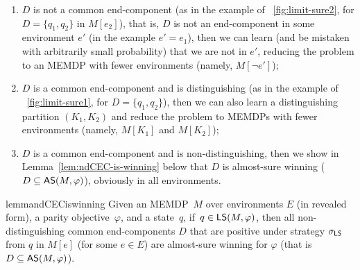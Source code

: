 \documentclass[a4paper,USenglish,cleveref, autoref, thm-restate]{lipics-v2021}
\newcommand\almostsure{\textrm{\sf AS}}
\newcommand\limitsure{\textrm{\sf LS}}
\begin{document}
\vspace{-0.1cm}
\begin{enumerate}
\item $D$ is not a common end-component (as in the example of \figurename~\ref{fig:limit-sure2}, for $D = \{q_1,q_2\}$ in $M[e_2]$),
that is, $D$ is not an end-component in some environment $e'$ (in the example $e' = e_1$), then we can 
learn (and be mistaken with arbitrarily small probability) that we are not in $e'$,
reducing the problem to an MEMDP with fewer environments (namely, $M[\lnot e']$);

\item $D$ is a common end-component and is distinguishing (as in the example of \figurename~\ref{fig:limit-sure1}, 
for $D = \{q_1,q_2\}$), then we can also learn a distinguishing partition $(K_1,K_2)$
and reduce the problem to MEMDPs with fewer environments (namely, $M[K_1]$ and $M[K_2]$);

\item $D$ is a common end-component and is non-distinguishing, then 
we show in Lemma~\ref{lem:ndCEC-is-winning} below that $D$ is almost-sure winning 
($D \subseteq \almostsure(M, \varphi)$), obviously in all environments.
\end{enumerate}
\vspace{-0.2cm}


\begin{restatable}{lemma}{ndCECiswinning}
\label{lem:ndCEC-is-winning}
	Given an MEMDP~$M$ over environments $E$ (in revealed form), a parity objective~$\varphi$, and a state~$q$,
	if~$q \in \limitsure(M,\varphi)$, then all non-distinguishing common end-components $D$
	that are positive under strategy $\sigma_{\limitsure}$ from $q$ in $M[e]$ (for some $e \in E$)
	are almost-sure winning for $\varphi$ (that is $D \subseteq \almostsure(M,\varphi)$).
\end{restatable}
\end{document}
